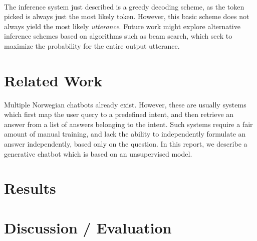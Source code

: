 \documentclass{article}
\begin{document}
\paragraph{}
The inference system just described is a greedy decoding scheme, as the token
picked is always just the most likely token. However, this basic scheme does
not always yield the most likely \emph{utterance}. Future work might explore
alternative inference schemes based on algorithms such as beam search, which
seek to maximize the probability for the entire output utterance.

\subsection*{}


\section*{Related Work}
Multiple Norwegian chatbots already exist. However, these are usually systems
which first map the user query to a predefined intent, and then retrieve an
answer from a list of answers belonging to the intent. Such systems require a
fair amount of manual training, and lack the ability to independently formulate
an answer independently, based only on the question.  In this report, we
describe a generative chatbot which is based on an unsupervised model.

\section*{Results}


\section*{Discussion / Evaluation}
\end{document}
